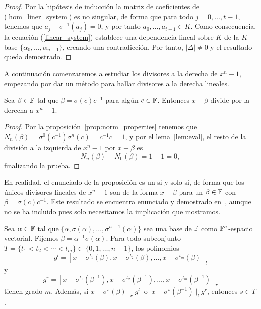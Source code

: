 \begin{proof}
Por la hipótesis de inducción la matriz de coeficientes de (\ref{hom_liner_system}) es no singular, de forma que para todo \(j = 0, \dots, t-1\), tenemos que \(a_j - \sigma^{-1}(a_j) = 0\), y por tanto \(a_0, \dots, a_{t-1} \in K\). Como consecuencia, la ecuación (\ref{linear_system}) establece una dependencia lineal sobre  \(K\) de la  \(K\)-base  \(\{\alpha_0, \dots, \alpha_{n-1}\}\), creando una contradicción. Por tanto, \(|\Delta| \neq 0\) y el resultado queda demostrado.
\end{proof}

A continuación comenzaremos a estudiar los divisores a la derecha de \(x^{n} -1\), empezando por dar un método para hallar divisores a la derecha lineales.

\begin{proposition}
\label{prop:linear_div}
    Sea \(\beta \in \mathbb{F}\) tal que \(\beta = \sigma(c)c^{-1}\) para algún \(c \in \mathbb{F}\). Entonces \(x - \beta\) divide por la derecha a \(x^{n}-1\).
\end{proposition}
\begin{proof}
Por la proposición~\ref{prop:norm_properties} tenemos que \(N_n(\beta) = \sigma^{0}(c^{-1})\sigma^{n}(c) = c^{-1}c = 1\), y por el lema~\ref{lem:eval}, el resto de la división a la izquierda de \(x^{n} - 1\) por \(x - \beta\) es
    \[
    N_n(\beta) - N_0(\beta) = 1 - 1 = 0
    ,\]
finalizando la prueba.
\end{proof}

\begin{remark}
En realidad, el enunciado de la proposición es un si y solo si, de forma que los únicos divisores lineales de \(x^{n} -1\) son de la forma \(x - \beta\) para un \(\beta \in \mathbb{F}\) con \(\beta = \sigma(c)c^{-1}\). Este resultado se encuentra enunciado y demostrado en~\cite{gomez-torrecillas_new_2016}, aunque no se ha incluido pues solo necesitamos la implicación que mostramos.
\end{remark}

\begin{lemma}
\label{lem:deg_lcm}
    Sea \(\alpha \in \mathbb{F}\) tal que \(\{\alpha, \sigma(\alpha), \dots, \sigma^{n-1}(\alpha)\}\) sea una base de \(\mathbb{F}\) como  \(\mathbb{F}^\sigma\)-espacio vectorial. Fijemos  \(\beta = \alpha^{-1}\sigma(\alpha)\). Para todo subconjunto \(T = \{t_1 < t_2 < \cdots < t_m\} \subset \{0, 1, \dots, n-1\}\), los polinomios
    \[
    g^l = [x - \sigma^{t_1}(\beta), x - \sigma^{t_2}(\beta), \dots, x - \sigma^{t_m}(\beta)]_l
    \]
y
    \[
    g^r = [x - \sigma^{t_1}(\beta^{-1}), x - \sigma^{t_2}(\beta^{-1}), \dots, x - \sigma^{t_m}(\beta^{-1})]_r
    \]
tienen grado \(m\). Además, si \(x - \sigma^s(\beta)  \mid_r g^l\ \) o \(\ x - \sigma^s(\beta^{-1})  \mid_l g^r\), entonces \(s \in T\).
\end{lemma}

